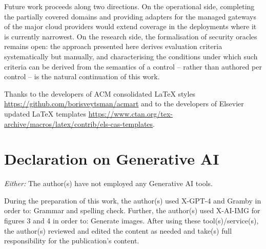 \documentclass[
]{ceurart}
\begin{document}
Future work proceeds along two directions.
On the operational side, completing the partially covered domains and providing adapters for the managed gateways of the major cloud providers would extend coverage in the deployments where it is currently narrowest.
On the research side, the formalisation of security oracles remains open: the approach presented here derives evaluation criteria systematically but manually, and characterising the conditions under which such criteria can be derived from the semantics of a control -- rather than authored per control -- is the natural continuation of this work.


\begin{acknowledgments}
  Thanks to the developers of ACM consolidated LaTeX styles
  \url{https://github.com/borisveytsman/acmart} and to the developers
  of Elsevier updated \LaTeX{} templates
  \url{https://www.ctan.org/tex-archive/macros/latex/contrib/els-cas-templates}.
\end{acknowledgments}

\section*{Declaration on Generative AI}
 {\em Either:}\newline
The author(s) have not employed any Generative AI tools.
\newline

During the preparation of this work, the author(s) used X-GPT-4 and Gramby in order to: Grammar and spelling check. Further, the author(s) used X-AI-IMG for figures 3 and 4 in order to: Generate images. After using these tool(s)/service(s), the author(s) reviewed and edited the content as needed and take(s) full responsibility for the publication’s content.



\end{document}
